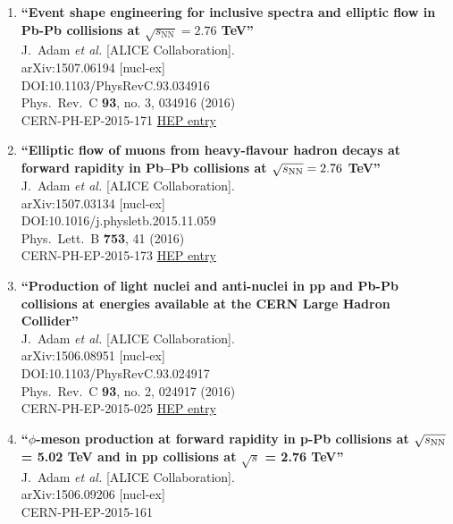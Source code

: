 \begin{enumerate}
\item%
{\bf ``Event shape engineering for inclusive spectra and elliptic flow in Pb-Pb collisions at $\sqrt{s_\mathrm{NN}}=2.76$ TeV''}
  \\{}J.~Adam {\it et al.} [ALICE Collaboration].
  \\{}arXiv:1507.06194 [nucl-ex]
  \\{}DOI:10.1103/PhysRevC.93.034916
  \\{}Phys.\ Rev.\ C {\bf 93}, no. 3, 034916 (2016)
  \\{}CERN-PH-EP-2015-171
\href{http://inspirehep.net/record/1384270}{HEP entry}
\item%
{\bf ``Elliptic flow of muons from heavy-flavour hadron decays at forward rapidity in Pb–Pb collisions at $\sqrt{s_{\rm NN}}= 2.76$ TeV''}
  \\{}J.~Adam {\it et al.} [ALICE Collaboration].
  \\{}arXiv:1507.03134 [nucl-ex]
  \\{}DOI:10.1016/j.physletb.2015.11.059
  \\{}Phys.\ Lett.\ B {\bf 753}, 41 (2016)
  \\{}CERN-PH-EP-2015-173
\href{http://inspirehep.net/record/1382591}{HEP entry}
\item%
{\bf ``Production of light nuclei and anti-nuclei in pp and Pb-Pb collisions at energies available at the CERN Large Hadron Collider''}
  \\{}J.~Adam {\it et al.} [ALICE Collaboration].
  \\{}arXiv:1506.08951 [nucl-ex]
  \\{}DOI:10.1103/PhysRevC.93.024917
  \\{}Phys.\ Rev.\ C {\bf 93}, no. 2, 024917 (2016)
  \\{}CERN-PH-EP-2015-025
\href{http://inspirehep.net/record/1380491}{HEP entry}
\item%
{\bf ``$\phi$-meson production at forward rapidity in p-Pb collisions at $\sqrt{s_{\rm NN}}$ = 5.02 TeV and in pp collisions at $\sqrt{s}$ = 2.76 TeV''}
  \\{}J.~Adam {\it et al.} [ALICE Collaboration].
  \\{}arXiv:1506.09206 [nucl-ex]
  \\{}CERN-PH-EP-2015-161

\end{enumerate}
